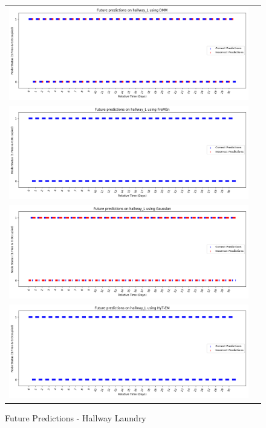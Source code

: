 \begin{center}
\begin{figure}[!Hp]
  \begin{tabular}{cc}
    {\includegraphics[width = 6in]{images/results/Future_hallway_L_DMM.png}} \\
    {\includegraphics[width = 6in]{images/results/Future_hallway_L_FreMEn.png}} \\
    {\includegraphics[width = 6in]{images/results/Future_hallway_L_Gaussian.png}} \\
    {\includegraphics[width = 6in]{images/results/Future_hallway_L_HyT-EM.png}} \\
  \end{tabular}
  \caption{Future Predictions - Hallway Laundry}
\end{figure}


\end{center}
